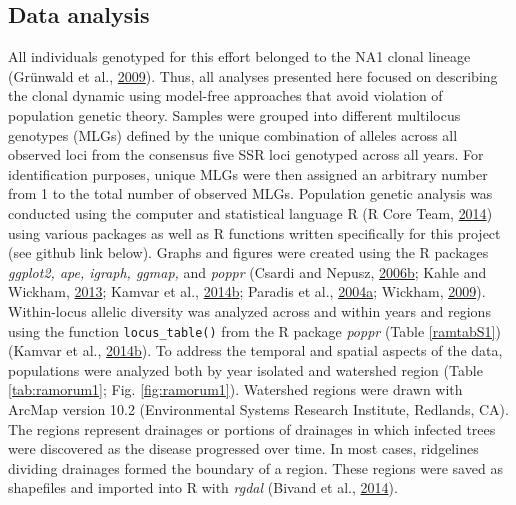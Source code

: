 \documentclass[double,12pt]{beavtex}
\begin{document}
  \subsection{Data analysis}\label{data-analysis-1}
  
  All individuals genotyped for this effort belonged to the NA1 clonal
  lineage (Grünwald et al.,
  \protect\hyperlink{ref-grunwald2009standardizing}{2009}). Thus, all
  analyses presented here focused on describing the clonal dynamic using
  model-free approaches that avoid violation of population genetic theory.
  Samples were grouped into different multilocus genotypes (MLGs) defined
  by the unique combination of alleles across all observed loci from the
  consensus five SSR loci genotyped across all years. For identification
  purposes, unique MLGs were then assigned an arbitrary number from 1 to
  the total number of observed MLGs. Population genetic analysis was
  conducted using the computer and statistical language R (R Core Team,
  \protect\hyperlink{ref-R2014}{2014}) using various packages as well as R
  functions written specifically for this project (see github link below).
  Graphs and figures were created using the R packages \emph{ggplot2, ape,
  igraph, ggmap,} and \emph{poppr} (Csardi and Nepusz,
  \protect\hyperlink{ref-csardi2006igraph}{2006}\protect\hyperlink{ref-csardi2006igraph}{b};
  Kahle and Wickham, \protect\hyperlink{ref-khale2013ggmap}{2013}; Kamvar
  et al.,
  \protect\hyperlink{ref-kamvar2014poppr}{2014}\protect\hyperlink{ref-kamvar2014poppr}{b};
  Paradis et al.,
  \protect\hyperlink{ref-paradis2004ape}{2004}\protect\hyperlink{ref-paradis2004ape}{a};
  Wickham, \protect\hyperlink{ref-wickham2009ggplot2}{2009}). Within-locus
  allelic diversity was analyzed across and within years and regions using
  the function \texttt{locus\_table()} from the R package \emph{poppr}
  (Table \ref{ramtabS1}) (Kamvar et al.,
  \protect\hyperlink{ref-kamvar2014poppr}{2014}\protect\hyperlink{ref-kamvar2014poppr}{b}).
  To address the temporal and spatial aspects of the data, populations
  were analyzed both by year isolated and watershed region (Table
  \ref{tab:ramorum1}; Fig. \ref{fig:ramorum1}). Watershed regions were
  drawn with ArcMap version 10.2 (Environmental Systems Research
  Institute, Redlands, CA). The regions represent drainages or portions of
  drainages in which infected trees were discovered as the disease
  progressed over time. In most cases, ridgelines dividing drainages
  formed the boundary of a region. These regions were saved as shapefiles
  and imported into R with \emph{rgdal} (Bivand et al.,
  \protect\hyperlink{ref-bivand2014rgdal}{2014}).
  
\end{document}
